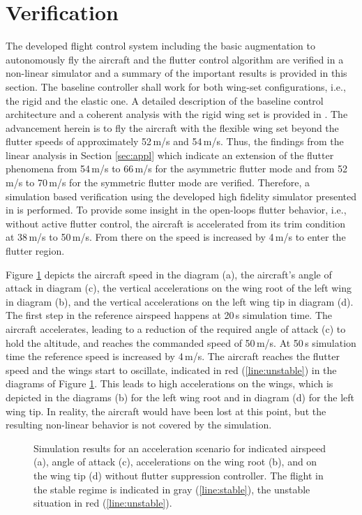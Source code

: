 \documentclass[aerospace,article,submit,moreauthors,pdftex,10pt,a4paper]{Definitions/mdpi}
\begin{document}
\section{Verification}\label{sec:verif}
The developed flight control system including the basic augmentation to autonomously fly the aircraft and the flutter control algorithm are verified in a non-linear simulator and a summary of the important results is provided in this section. The  baseline controller  shall work for both wing-set configurations, i.e., the rigid and the elastic one. A detailed description of the baseline control architecture and a coherent analysis with the rigid wing set is provided in \cite{Ossmann19a}. The advancement herein is to fly the aircraft with the flexible wing set beyond the flutter speeds of approximately 52\,m/s and 54\,m/s. Thus, the findings from the linear analysis in Section \ref{sec:appl} which indicate an extension of the flutter phenomena from 54\,m/s to 66\,m/s for the asymmetric flutter mode and from 52\,m/s to 70\,m/s for the symmetric flutter mode 
are verified. Therefore, a simulation based verification using the developed high fidelity simulator presented in  \cite{Wuestenhagen18} is performed.  To provide some insight in the open-loops flutter behavior, i.e., without active flutter control, the aircraft is accelerated from its trim condition at 38\,m/s to 50\,m/s. From there on the speed is increased by 4\,m/s to enter the flutter region.



Figure \ref{fig:ol} depicts the aircraft speed in the diagram (a), the aircraft's angle of attack in diagram (c), the vertical accelerations on the wing root of the left wing in diagram (b), and the vertical accelerations on the left wing tip in  diagram (d). The first step in the reference airspeed happens at 20\,s simulation time. The aircraft accelerates, leading to a reduction of the required angle of attack (c) to hold the altitude, and reaches the commanded speed of 50\,m/s. At 50\,s simulation time the reference speed is increased by 4\,m/s. The aircraft reaches the flutter speed and the wings start to oscillate, indicated in red (\ref{line:unstable}) in the diagrams of Figure \ref{fig:ol}. This leads to high accelerations on the wings, which is depicted in the diagrams (b) for the left wing root and in diagram (d) for the left wing tip. In reality, the aircraft would have been lost at this point, but the resulting non-linear behavior is not covered by the simulation.

\begin{figure}[h]
	\centering
	
	\caption{Simulation results for an acceleration scenario for indicated airspeed (a), angle of attack (c), accelerations on the wing root (b), and on the wing tip (d) without flutter suppression controller. The flight in the stable regime is indicated in gray (\ref{line:stable}), the unstable situation in red (\ref{line:unstable}). }
	\label{fig:ol}	
\end{figure}
\end{document}
